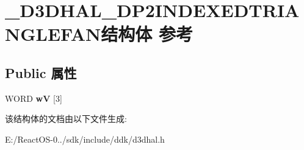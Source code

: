 \hypertarget{struct___d3_d_h_a_l___d_p2_i_n_d_e_x_e_d_t_r_i_a_n_g_l_e_f_a_n}{}\section{\+\_\+\+D3\+D\+H\+A\+L\+\_\+\+D\+P2\+I\+N\+D\+E\+X\+E\+D\+T\+R\+I\+A\+N\+G\+L\+E\+F\+A\+N结构体 参考}
\label{struct___d3_d_h_a_l___d_p2_i_n_d_e_x_e_d_t_r_i_a_n_g_l_e_f_a_n}
\subsection*{Public 属性}
\begin{DoxyCompactItemize}
\item 
\mbox{\label{struct___d3_d_h_a_l___d_p2_i_n_d_e_x_e_d_t_r_i_a_n_g_l_e_f_a_n_a1955a8a8cc6f2831e6ecb9580b128fa6}} 
W\+O\+RD {\bfseries wV} \mbox{[}3\mbox{]}
\end{DoxyCompactItemize}


该结构体的文档由以下文件生成\+:\begin{DoxyCompactItemize}
\item 
E\+:/\+React\+O\+S-\/0../sdk/include/ddk/d3dhal.\+h\end{DoxyCompactItemize}
